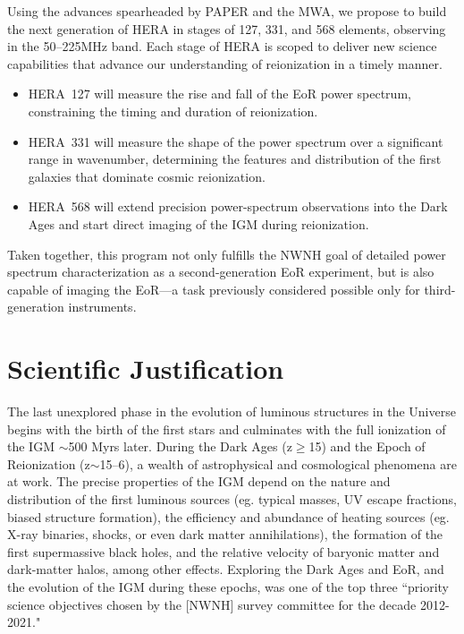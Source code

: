 \documentclass[preprint]{aastex}
\begin{document}
Using the advances spearheaded by
PAPER and the MWA,
we propose to build the next generation of HERA in stages of 127, 331, and 568 elements,
observing in the 50--225MHz band.
Each stage of HERA is scoped to deliver new science capabilities that advance our
understanding of reionization in a timely manner.
\begin{itemize}\setlength{\parskip}{0pt}\itemsep0pt
\item HERA~127 will measure the rise and fall of the EoR power
spectrum, constraining the timing and duration of reionization.
\item HERA~331 will measure the shape of the power spectrum over
a significant range in wavenumber, determining the features and distribution of
the first galaxies that dominate cosmic reionization.
\item HERA~568 will extend precision power-spectrum observations
into the Dark Ages and start direct imaging of the IGM during reionization.
\end{itemize}
{ \setlength{\parindent}{0cm}
Taken together, this program
not only fulfills the NWNH goal of detailed power spectrum
characterization as a second-generation EoR experiment, but is also
capable of imaging the EoR---a task previously considered possible only for
third-generation instruments.}

\vspace{-0.25in}
\section{Scientific Justification}
\label{SJsec}

The last unexplored phase in the evolution of luminous structures in the
Universe begins with the birth of the first stars and culminates with the full
ionization of the IGM $\sim$500 Myrs later.  During the Dark Ages
(z$\ge$15) and the Epoch of Reionization (z$\sim$15--6), a wealth of
astrophysical and cosmological phenomena are at work.  The precise properties
of the IGM depend on the nature and distribution of the first luminous sources
(eg. typical masses, UV escape fractions, biased structure formation), the
efficiency and abundance of heating sources (eg.  X-ray binaries, shocks, or
even dark matter annihilations), the formation of the first supermassive black
holes, and the relative velocity of baryonic matter and dark-matter halos,
among other effects.  Exploring the Dark Ages and EoR, and the evolution of
the IGM during these epochs, was one of the top three
``priority science objectives chosen by the [NWNH] survey committee for the
decade 2012-2021."
\end{document}
